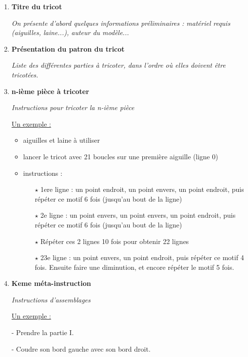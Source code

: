 \documentclass{article}
\begin{document}
\begin{enumerate}
  \item \textbf{Titre du tricot}

\textit{On présente d'abord quelques informations préliminaires : matériel requis (aiguilles, laine...), 
auteur du modèle...}

  \item \textbf{Présentation du patron du tricot}

\textit{Liste des différentes parties à tricoter, dans l'ordre où elles doivent être tricotées.}

  \item \textbf{n-ième pièce à tricoter}

\textit{Instructions pour tricoter la n-ième pièce}

\underline{Un exemple :} 

    \begin{itemize}

  \item aiguilles et laine à utiliser 

  \item lancer le tricot avec 21 boucles sur une première aiguille (ligne 0)

  \item instructions :
  
	\begin{itemize}
	 \item[$\star$] 1ere ligne : un point endroit, un point envers, un point endroit, puis répéter ce motif 6 fois (jusqu'au bout de la ligne)

	 \item[$\star$] 2e ligne : un point envers, un point envers, un point endroit, puis répéter ce motif 6 fois (jusqu'au bout de la ligne)

	 \item[$\star$] Répéter ces 2 lignes 10 fois pour obtenir 22 lignes

	 \item[$\star$] 23e ligne : un point envers, un point endroit, puis répéter ce motif 4 fois. Ensuite faire une diminution, et encore répéter le motif 5 fois.

	\end{itemize}
	 
    \end{itemize}

  \item \textbf{Keme méta-instruction}

\textit{Instructions d'assemblages}

\underline{Un exemple :}

- Prendre la partie I.

- Coudre son bord gauche avec son bord droit.

\end{enumerate}
\end{document}
